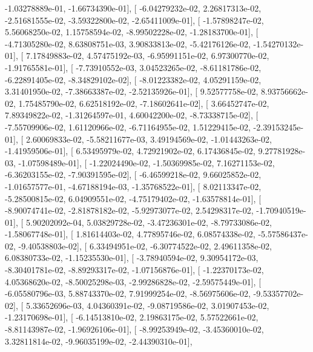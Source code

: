 \documentclass{article}
\begin{document}
         -1.03278889e-01,  -1.66734390e-01],
       [ -6.04279232e-02,   2.26817313e-02,  -2.51681555e-02,
         -3.59322800e-02,  -2.65411009e-01],
       [ -1.57898247e-02,   5.56068250e-02,   1.15758594e-02,
         -8.99502228e-02,  -1.28183700e-01],
       [ -4.71305280e-02,   8.63808751e-03,   3.90833813e-02,
         -5.42176126e-02,  -1.54270132e-01],
       [  7.17849883e-02,   4.57475192e-03,  -6.95991151e-02,
          6.97300770e-02,  -1.91765581e-01],
       [ -7.73910552e-03,   3.04523265e-02,  -8.61181786e-02,
         -6.22891405e-02,  -8.34829102e-02],
       [ -8.01223382e-02,   4.05291159e-02,   3.31401950e-02,
         -7.38663387e-02,  -2.52135926e-01],
       [  9.52577758e-02,   8.93756662e-02,   1.75485790e-02,
          6.62518192e-02,  -7.18602641e-02],
       [  3.66452747e-02,   7.89349822e-02,  -1.31264597e-01,
          4.60042200e-02,  -8.73338715e-02],
       [ -7.55709906e-02,   1.61120966e-02,  -6.71164955e-02,
          1.51229415e-02,  -2.39153245e-01],
       [  2.60069833e-02,  -5.58211677e-03,   3.49194569e-02,
         -1.01443263e-02,  -1.41959506e-01],
       [  6.53495979e-02,   4.72921902e-02,   6.17436845e-02,
          9.27781928e-03,  -1.07598489e-01],
       [ -1.22024490e-02,  -1.50369985e-02,   7.16271153e-02,
         -6.36203155e-02,  -7.90391595e-02],
       [ -6.46599218e-02,   9.66025852e-02,  -1.01657577e-01,
         -4.67188194e-03,  -1.35768522e-01],
       [  8.02113347e-02,  -5.28500815e-02,   6.04909551e-02,
         -4.75179402e-02,  -1.63578814e-01],
       [ -8.90074741e-02,  -2.81878182e-02,  -5.92973077e-02,
          2.54298317e-02,  -1.70940519e-01],
       [  5.90202092e-04,   5.03829728e-02,  -3.47236301e-02,
         -8.79733086e-02,  -1.58067748e-01],
       [  1.81614403e-02,   4.77895746e-02,   6.08574338e-02,
         -5.57586437e-02,  -9.40538803e-02],
       [  6.33494951e-02,  -6.30774522e-02,   2.49611358e-02,
          6.08380733e-02,  -1.15235530e-01],
       [ -3.78940594e-02,   9.30954172e-03,  -8.30401781e-02,
         -8.89293317e-02,  -1.07156876e-01],
       [ -1.22370173e-02,   4.05368620e-02,  -8.50025298e-03,
         -2.99286828e-02,  -2.59575449e-01],
       [ -6.05580796e-03,   5.88743370e-02,   7.91999254e-02,
         -8.56975606e-02,  -9.53357702e-02],
       [  5.33652696e-03,   4.04360391e-02,  -9.08719586e-02,
          3.01907453e-02,  -1.23170698e-01],
       [ -6.14513810e-02,   2.19863175e-02,   5.57522661e-02,
         -8.81143987e-02,  -1.96926106e-01],
       [ -8.99253949e-02,  -3.45360010e-02,   3.32811814e-02,
         -9.96035199e-02,  -2.44390310e-01],
\end{document}
